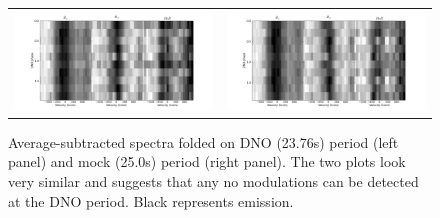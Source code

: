 \begin{figure}[ht]
\begin{narrow}{-1.25in}{0in}
\begin{tabular}{cc}
\includegraphics[width=0.7\columnwidth, bb = 0 0 1200 600]{spectroscopy/final/specgram_fold_ave_sub_DNO23.76.png} & 
\includegraphics[width=0.7\columnwidth, bb = 0 0 1200 600]{spectroscopy/final/specgram_fold_ave_sub_DNO25.0.png}
\end{tabular}
\end{narrow} 

\caption[Average-subtracted spectra folded on DNO period]{Average-subtracted spectra folded on DNO (23.76s) period (left panel) and mock (25.0s) period (right panel). The two plots look very similar and suggests that any no modulations can be detected at the DNO period. Black represents emission.}
\label{specgram_fold_ave_subDNO}
\end{figure}


